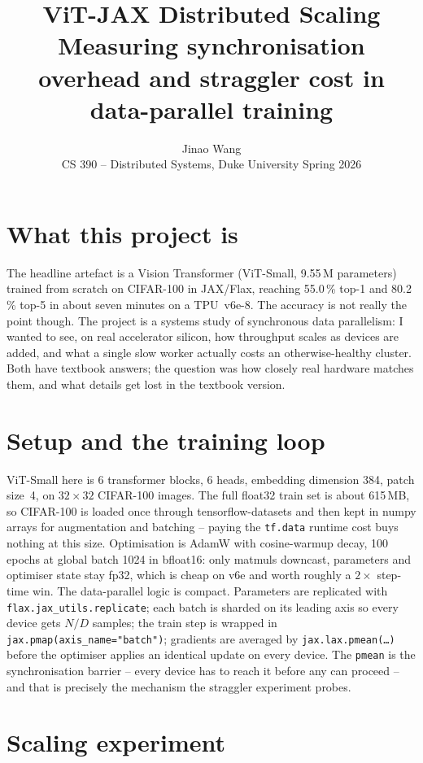 \documentclass[11pt]{article}
\title{\vspace{-2.4em}ViT-JAX Distributed Scaling\\[2pt]
\large Measuring synchronisation overhead and straggler cost in data-parallel training}
\author{Jinao Wang \\[-2pt] \small CS 390 -- Distributed Systems, Duke University \quad\textbar\quad Spring 2026}
\date{\vspace{-1.5em}}
\begin{document}
\maketitle
\vspace{-1.8em}

\section*{What this project is}

The headline artefact is a Vision Transformer (ViT-Small, 9.55\,M parameters) trained from
scratch on CIFAR-100 in JAX/Flax, reaching 55.0\,\% top-1 and 80.2\,\% top-5 in about seven
minutes on a TPU~v6e-8. The accuracy is not really the point though. The project is a
systems study of synchronous data parallelism: I wanted to see, on real accelerator silicon,
how throughput scales as devices are added, and what a single slow worker actually costs an
otherwise-healthy cluster. Both have textbook answers; the question was how closely real
hardware matches them, and what details get lost in the textbook version.

\section*{Setup and the training loop}

ViT-Small here is 6 transformer blocks, 6 heads, embedding dimension 384, patch size~4,
on $32{\times}32$ CIFAR-100 images. The full float32 train set is about 615\,MB, so
CIFAR-100 is loaded once through tensorflow-datasets and then kept in numpy arrays for
augmentation and batching -- paying the \texttt{tf.data} runtime cost buys nothing at this
size. Optimisation is AdamW with cosine-warmup decay, 100 epochs at global batch 1024 in
bfloat16: only matmuls downcast, parameters and optimiser state stay fp32, which is cheap
on v6e and worth roughly a $2\times$ step-time win. The data-parallel logic is compact.
Parameters are replicated with \texttt{flax.jax\_utils.replicate}; each batch is sharded
on its leading axis so every device gets $N/D$ samples; the train step is wrapped in
\texttt{jax.pmap(axis\_name{=}"batch")}; gradients are averaged by
\texttt{jax.lax.pmean(\ldots)} before the optimiser applies an identical update on every
device. The \texttt{pmean} is the synchronisation barrier -- every device has to reach it
before any can proceed -- and that is precisely the mechanism the straggler experiment
probes.

\section*{Scaling experiment}
\end{document}
